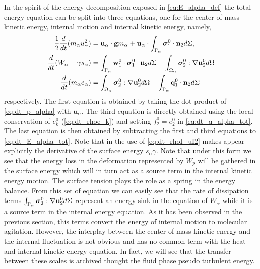In the spirit of the energy decomposition exposed in \ref{eq:E_alpha_def} the total energy equation can be split into three equations, one for the center of mass kinetic energy, internal motion and internal kinetic energy, namely,  
\begin{align}
    \label{eq:dt_u2_alpha}
    \frac{1}{2}\frac{d}{d t} (m_\alpha u_\alpha^2)
    &= 
    \textbf{u}_\alpha\cdot
    \textbf{g}m_\alpha
    + 
    \textbf{u}_\alpha\cdot
    \int_{\Gamma_\alpha} \bm\sigma_1^0 \cdot \textbf{n}_2 d\Sigma,\\
    \label{eq:dt_w2_alpha}
    \frac{d}{d t} (W_\alpha + \gamma s_\alpha)
    &= 
    \int_{\Gamma_\alpha} \textbf{w}_1^0 \cdot \bm{\sigma}_1^0 \cdot \textbf{n}_2  d\Sigma
    - \int_{\Omega_\alpha}  \bm{\sigma}_2^0 : \mathbf{\nabla}\textbf{u}_2^0  d\Omega
    \\
     \label{eq:dt_e_alpha}
    \frac{d}{d t} (m_\alpha e_\alpha )
    &= 
     \int_{\Omega_\alpha}  \bm{\sigma}_2^0 : \mathbf{\nabla}\textbf{u}_2^0   d\Omega
    -  \int_{\Gamma_\alpha} \textbf{q}_1^0\cdot \textbf{n}_2  d\Sigma 
\end{align}
respectively. 
The first equation is obtained by taking the dot product of \ref{eq:dt_p_alpha} with $\textbf{u}_\alpha$. 
The third equation is directly obtained using the local conservation of $e_k^0$ (\ref{eq:dt_rhoe_k}) and setting $f_2^0 = e_2^0$ in \ref{eq:dt_q_alpha_tot}.
The last equation is then obtained by subtracting the first and third equations to \ref{eq:dt_E_alpha_tot}. 
Note that in \citet{eq:dt_w2_alpha} the use of \ref{eq:dt_rhoI_uI2} makes appear explicitly the derivative of the surface energy $s_\alpha \gamma$. 
Note that under this form we see that the energy loss in the deformation represented by $W_p$ will be gathered in the surface energy which will in turn act as a source term in the internal kinetic energy motion.
The surface tension plays the role as a spring in the energy balance.   
From this set of equation we can easily see that the rate of dissipation terms $\int_{\Gamma_\alpha} \bm{\sigma}_2^0 : \mathbf{\nabla}\textbf{u}_2^0 d\Sigma$ represent an energy sink in the equation of $W_\alpha$ while it is a source term in the internal energy equation. 
As it has been observed in the previous section, this terms convert the energy of internal motion to molecular agitation. 
However, the interplay between the center of mass  kinetic energy and the internal fluctuation is not obvious and has no common term with the heat and internal kinetic energy equation.
In fact, we will see that the transfer between these scales is archived thought the fluid phase pseudo turbulent energy. 

